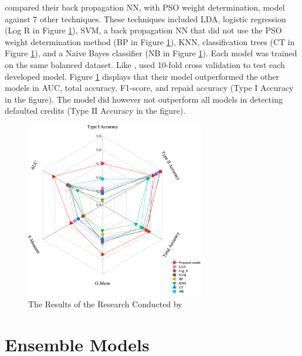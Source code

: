 \vspace{10pt}

\textcite{NNShen} compared their back propagation NN, with PSO weight determination, model against 7 other techniques. These techniques included LDA, logistic regression (Log R in Figure \ref{fig:shen}), SVM, a back propagation NN that did not use the PSO weight determination method (BP in Figure \ref{fig:shen}), KNN, classification trees (CT in Figure \ref{fig:shen}), and a Naive Bayes classifier (NB in Figure \ref{fig:shen}). Each model was trained on the same balanced dataset. Like \textcite{NNWest}, \textcite{NNShen} used 10-fold cross validation to test each developed model. Figure \ref{fig:shen} displays that their model outperformed the other models in AUC, total accuracy, F1-score, and repaid accuracy (Type I Accuracy in the figure). The model did however not outperform all models in detecting defaulted credits (Type II Accuracy in the figure). 

\vspace{10pt}

\begin{figure}[!htb]
\centering
\includegraphics[width=0.7\textwidth]{images/shen.png}
\caption{The Results of the Research Conducted by \textcite{NNShen}}
\label{fig:shen}
\end{figure}

\vspace{10pt}


\section{Ensemble Models}

